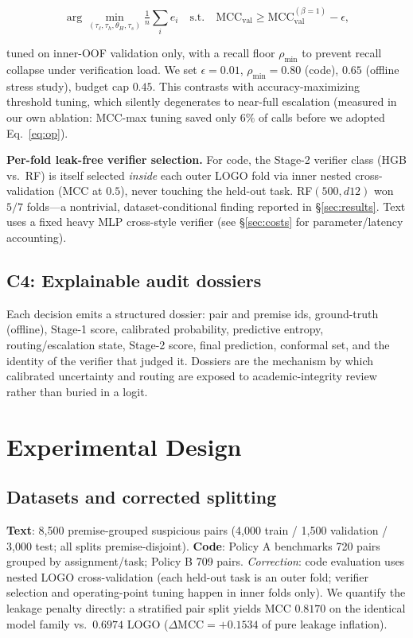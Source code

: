 \documentclass[conference]{IEEEtran}
\newcommand{\mcc}{\mathrm{MCC}}
\begin{document}
\begin{equation}
\arg\min_{(\tau_\ell,\tau_h,\theta_H,\tau_s)} \tfrac{1}{n}\textstyle\sum_i e_i
\quad \text{s.t.}\quad
\mcc_{\mathrm{val}} \ge \mcc_{\mathrm{val}}^{(\beta=1)} - \epsilon ,
\label{eq:op}
\end{equation}

\noindent tuned on inner-OOF validation only, with a recall floor $\rho_{\min}$ to prevent recall
collapse under verification load. We set $\epsilon{=}0.01$, $\rho_{\min}{=}0.80$ (code),
$0.65$ (offline stress study), budget cap $0.45$. This contrasts with accuracy-maximizing
threshold tuning, which silently degenerates to near-full escalation (measured in our own
ablation: MCC-max tuning saved only $6\%$ of calls before we adopted Eq.~\eqref{eq:op}).

\textbf{Per-fold leak-free verifier selection.} For code, the Stage-2 verifier class (HGB vs.\ RF)
is itself selected \emph{inside} each outer LOGO fold via inner nested cross-validation (MCC at
$0.5$), never touching the held-out task. RF$(500,\!d12)$ won $5/7$ folds---a nontrivial,
dataset-conditional finding reported in \S\ref{sec:results}. Text uses a fixed heavy MLP
cross-style verifier (see \S\ref{sec:costs} for parameter/latency accounting).

\subsection{C4: Explainable audit dossiers}
Each decision emits a structured dossier: pair and premise ids, ground-truth (offline), Stage-1
score, calibrated probability, predictive entropy, routing/escalation state, Stage-2 score, final
prediction, conformal set, and the identity of the verifier that judged it. Dossiers are the
mechanism by which calibrated uncertainty and routing are exposed to academic-integrity review
rather than buried in a logit.

\section{Experimental Design}
\label{sec:setup}

\subsection{Datasets and corrected splitting}
\textbf{Text}: 8{,}500 premise-grouped suspicious pairs (4{,}000 train / 1{,}500 validation /
3{,}000 test; all splits premise-disjoint). \textbf{Code}: Policy A benchmarks 720 pairs grouped by
assignment/task; Policy B 709 pairs. \emph{Correction}: code evaluation uses nested LOGO
cross-validation (each held-out task is an outer fold; verifier selection and operating-point
tuning happen in inner folds only). We quantify the leakage penalty directly: a stratified pair
split yields MCC $0.8170$ on the identical model family vs.\ $0.6974$ LOGO
($\Delta\mcc = +0.1534$ of pure leakage inflation).
\end{document}
